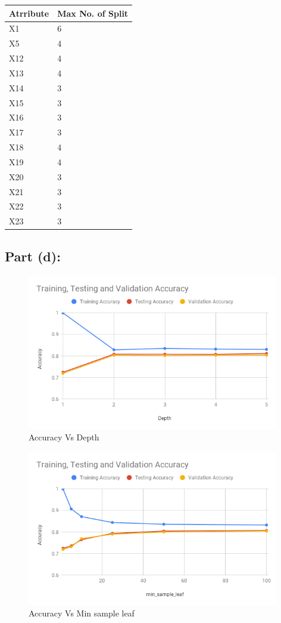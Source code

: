 \documentclass[a4 paper]{article}
\begin{document}
\hskip1.0cm\begin{tabular}{ |p{2.7cm}||p{2.5cm} |}
	 \hline
	 \hline \textbf{Atrribute} & \textbf{Max No. of Split}\\
	 \hline
	 X1		& 6 \\
	 X5		& 4 \\
	 X12	& 4 \\
	 X13	& 4 \\
	 X14	& 3 \\
	 X15	& 3 \\
	 X16	& 3 \\
	 X17	& 3 \\
	 X18	& 4 \\
	 X19	& 4 \\
	 X20	& 3 \\
	 X21	& 3 \\
	 X22	& 3 \\
	 X23	& 3 \\
	 \hline
\end{tabular}

\subsection*{Part (d):}

\begin{figure}[ht!]
	\centering %
	\includegraphics[width=110mm]{./chart/DT_d1.png}
	\caption{Accuracy Vs Depth}
\end{figure}

\begin{figure}[ht!]
	\centering %
	\includegraphics[width=110mm]{./chart/DT_d2.png}
	\caption{Accuracy Vs Min sample leaf}
\end{figure}
\end{document}
